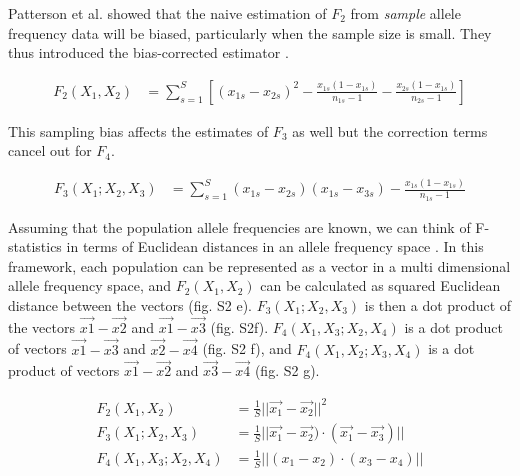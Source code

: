 \documentclass[12pt, letterpaper]{article}
\begin{document}
Patterson et al. showed that the naive estimation of $F_2$ from \emph{sample} allele frequency data will be biased, particularly when the sample size is small. They thus  introduced the bias-corrected estimator \cite{peter_admixture_2016, patterson_ancient_2012}.

\begin{align}\label{eq:f2_correction}
F_2(X_1,X_2) &= \sum_{s=1}^S[(x_{1s} - x_{2s})^2 - \frac{x_{1s}(1-x_{1s})}{n_{1s}-1} - \frac{x_{2s}(1-x_{1s})}{n_{2s}-1}]
\end{align}


This sampling bias affects the estimates of $F_3$ as well but the correction terms cancel out for $F_4$.

\begin{align}\label{eq:f3_correction}
F_3(X_1;X_2,X_3) &= \sum_{s=1}^S(x_{1s} - x_{2s})(x_{1s} - x_{3s}) - \frac{x_{1s}(1-x_{1s})}{n_{1s}-1}
\end{align}

Assuming that the population allele frequencies are known, we can think of F-statistics in terms of Euclidean distances in an allele frequency space \cite{oteo-garcia_geometrical_2021}. In this framework, each population can be represented as a vector in a multi dimensional allele frequency space, and $F_2(X_1, X_2)$ can be calculated as squared Euclidean distance between the vectors (fig. S2 e). $F_3(X_1;X_2,X_3)$ is then a dot product of the vectors $\Vec{x1} - \Vec{x2}$ and $\Vec{x1} - \Vec{x3}$ (fig. S2f). $F_4(X_1,X_3;X_2,X_4)$ is a dot product of vectors $\Vec{x1} - \Vec{x3}$ and $\Vec{x2} - \Vec{x4}$ (fig. S2 f), and $F_4(X_1,X_2;X_3,X_4)$ is a dot product of vectors $\Vec{x1} - \Vec{x2}$ and $\Vec{x3} - \Vec{x4}$ (fig. S2 g). 

\begin{align}\label{eq:f_geometric}
F_2(X_1,X_2) &= \frac{1}{S}||\Vec{x_{1}} - \vec{x_{2}}||^2\nonumber\\
F_3(X_1;X_2,X_3) &= \frac{1}{S}||\vec{x_{1}} - \vec{x_{2}})\cdot(\vec{x_{1}} - \vec{x_{3}})||\nonumber\\
F_4(X_1,X_3;X_2,X_4) &= \frac{1}{S}||(x_{1} - x_{2})\cdot(x_{3} - x_{4})||\nonumber\\
\end{align}
\end{document}
